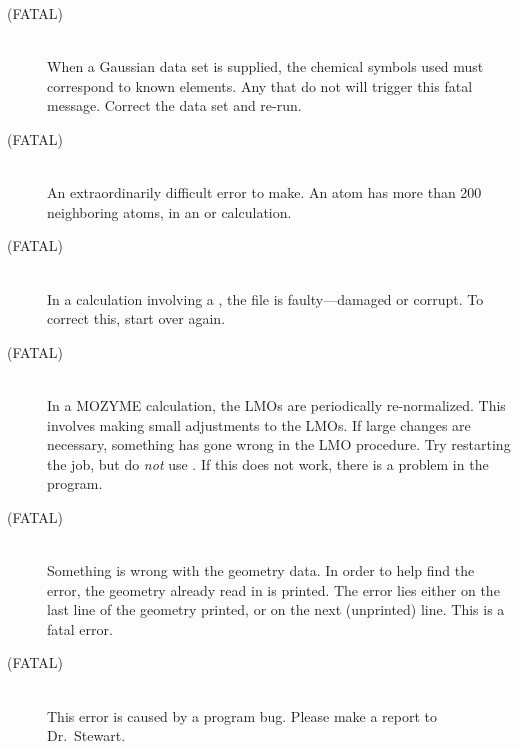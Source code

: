\begin{description}
\item[     (FATAL)]~\\
When a Gaussian data set is supplied, the chemical symbols used must
correspond  to known elements.  Any that do not will trigger this fatal
message. Correct the data set and re-run.

\item[ (FATAL)]~\\
An extraordinarily difficult error to make.  An atom has more than 200
neighboring atoms, in an  or  calculation.

\item[ (FATAL)]~\\
In a  calculation involving a , the  file
is faulty---damaged or corrupt.  To correct this,  start over again.
                    
\item[ (FATAL)]~\\
In a MOZYME calculation, the LMOs are periodically re-normalized.  This
involves making small adjustments to the LMOs.  If large changes are necessary,
something has gone wrong in the LMO procedure.  Try restarting the job, but do 
{\em not} use .  If this does not work, there is a problem in the 
program.

\item[ (FATAL)]~\\
Something is wrong with the geometry data.  In order to  help  find the 
error,  the  geometry  already  read in is printed.  The error lies either on
the last  line  of  the  geometry  printed,  or  on  the  next (unprinted)
line.  This is a fatal error.


\item[ (FATAL)]~\\
This error is caused by a program bug.  Please make a report to Dr.~Stewart.


\end{description}

